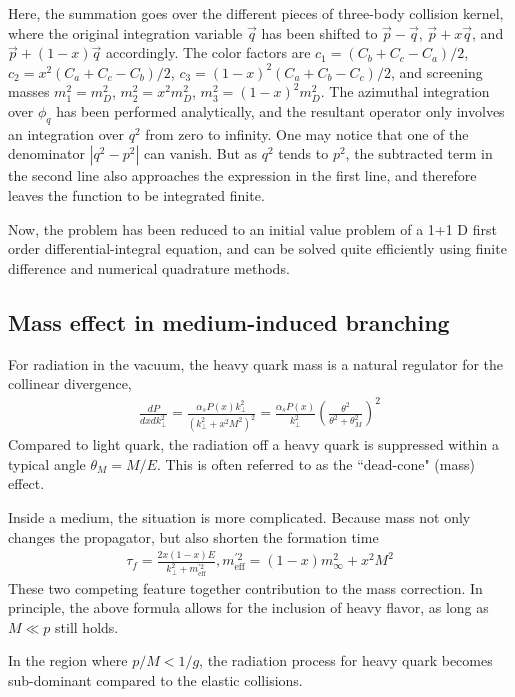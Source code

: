 Here, the summation goes over the different pieces of three-body collision kernel, where the original integration variable $\vec{q}$ has been shifted to $\vec{p}-\vec{q}$, $\vec{p}+x\vec{q}$, and $\vec{p}+(1-x) \vec{q}$ accordingly.
The color factors are $c_1 = (C_b+C_c-C_a)/2$, $c_2 = x^2(C_a+C_c-C_b)/2$, $c_3 = (1-x)^2(C_a+C_b-C_c)/2$, and screening masses $m_1^2 = m_D^2$, $m_2^2 = x^2 m_D^2$, $m_3^2 = (1-x)^2 m_D^2$.
The azimuthal integration over $\phi_q$ has been performed analytically, and the resultant operator only involves an integration over $q^2$ from zero to infinity.
One may notice that one of the denominator $|q^2-p^2|$ can vanish.
But as $q^2$ tends to $p^2$, the subtracted term in the second line also approaches the expression in the first line, and therefore leaves the function to be integrated finite.

Now, the problem has been reduced to an initial value problem of a 1+1 D first order differential-integral equation, and can be solved quite efficiently using finite difference and numerical quadrature methods.


\subsection{Mass effect in medium-induced branching}
For radiation in the vacuum, the heavy quark mass is a natural regulator for the collinear divergence,
\begin{eqnarray}
\frac{dP}{dx dk_\perp^2} = \frac{\alpha_s P(x) k_\perp^2}{(k_\perp^2 + x^2 M^2)^2} = \frac{\alpha_s P(x)}{k_\perp^2}\left(\frac{\theta^2}{\theta^2 + \theta_M^2}\right)^2
\end{eqnarray}
Compared to light quark, the radiation off a heavy quark is suppressed within a typical angle $\theta_M = M/E$.
This is often referred to as the ``dead-cone" (mass) effect.

Inside a medium, the situation is more complicated. 
Because mass not only changes the propagator, but also shorten the formation time
\begin{eqnarray}
\tau_f = \frac{2x(1-x)E}{k_\perp^2 + m_{\textrm{eff}}^{'2}}, m_{\textrm{eff}}^{'2} = (1-x)m_\infty^2 + x^2 M^2
\end{eqnarray}
These two competing feature together contribution to the mass correction.
In principle, the above formula allows for the inclusion of heavy flavor, as long as $M\ll p$ still holds.

In the region where $p/M < 1/g$, the radiation process for heavy quark becomes sub-dominant compared to the elastic collisions.

